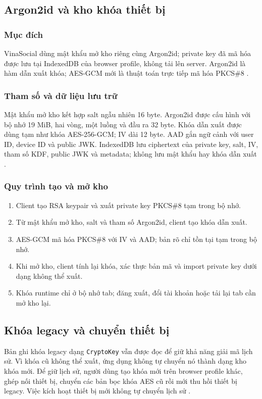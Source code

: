 \subsection{Argon2id và kho khóa thiết bị}
\subsubsection{Mục đích}
VinaSocial dùng mật khẩu mở kho riêng cùng Argon2id; private key đã mã hóa được lưu tại IndexedDB của browser profile, không tải lên server. Argon2id là hàm dẫn xuất khóa; AES-GCM mới là thuật toán trực tiếp mã hóa PKCS\#8 \cite{e2ee}.

\subsubsection{Tham số và dữ liệu lưu trữ}
Mật khẩu mở kho kết hợp salt ngẫu nhiên 16 byte. Argon2id được cấu hình với bộ nhớ 19 MiB, hai vòng, một luồng và đầu ra 32 byte. Khóa dẫn xuất được dùng tạm như khóa AES-256-GCM; IV dài 12 byte. AAD gắn ngữ cảnh với user ID, device ID và public JWK. IndexedDB lưu ciphertext của private key, salt, IV, tham số KDF, public JWK và metadata; không lưu mật khẩu hay khóa dẫn xuất \cite{e2ee}.

\subsubsection{Quy trình tạo và mở kho}
\begin{enumerate}
\item Client tạo RSA keypair và xuất private key PKCS\#8 tạm trong bộ nhớ.
\item Từ mật khẩu mở kho, salt và tham số Argon2id, client tạo khóa dẫn xuất.
\item AES-GCM mã hóa PKCS\#8 với IV và AAD; bản rõ chỉ tồn tại tạm trong bộ nhớ.
\item Khi mở kho, client tính lại khóa, xác thực bản mã và import private key dưới dạng không thể xuất.
\item Khóa runtime chỉ ở bộ nhớ tab; đăng xuất, đổi tài khoản hoặc tải lại tab cần mở kho lại.
\end{enumerate}

\subsection{Khóa legacy và chuyển thiết bị}
Bản ghi khóa legacy dạng \texttt{CryptoKey} vẫn được đọc để giữ khả năng giải mã lịch sử. Vì khóa cũ không thể xuất, ứng dụng không tự chuyển nó thành dạng kho khóa mới. Để giữ lịch sử, người dùng tạo khóa mới trên browser profile khác, ghép nối thiết bị, chuyển các bản bọc khóa AES cũ rồi mới thu hồi thiết bị legacy. Việc kích hoạt thiết bị mới không tự chuyển lịch sử \cite{e2ee}.

